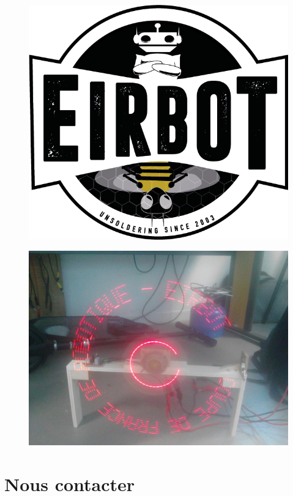 \documentclass[a4paper,10pt]{article}
\begin{document}
\begin{spacing}{1.5}
\newpage
\begin{multicols}{2}
  \begin{figure}[H]
    \center
    \includegraphics[scale=0.3]{LogoEirbot.png}
  \end{figure}
  \columnbreak
  \begin{figure}[H]
    \center
    \includegraphics[scale=0.2]{tourne.jpg}
  \end{figure}
\end{multicols}

\newpage
\section{Nous contacter}

\newpage
\end{spacing}
\end{document}
